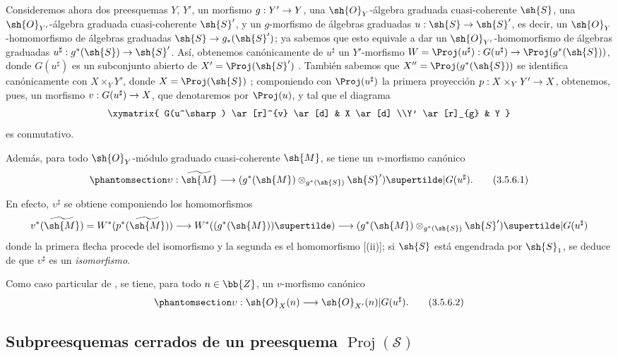\documentclass[oneside,10pt]{amsart}
\makeatletter
\newcommand{\ega@arrow}[2]{\mathchoice{#1}{#2}{#2}{#2}}
\renewcommand{\to}{\ega@arrow{\longrightarrow}{\rightarrow}}
\newcommand{\oldpage}[2][]{\marginnote{\normalfont\footnotesize\textbf{#1}~|~#2}\ignorespaces}
\let\EGAOriginalLabel\label
\renewcommand{\label}[1]{\phantomsection\EGAOriginalLabel{#1}}
\makeatother
\begin{document}
\begin{env}[3.5.6]
\label{II.3.5.6}
Consideremos ahora dos preesquemas $Y$, $Y'$, un morfismo $g:Y'\to Y$, una $\sh{O}_Y$-álgebra graduada cuasi-coherente $\sh{S}$, una $\sh{O}_{Y'}$-álgebra graduada cuasi-coherente $\sh{S}'$, y un $g$-morfismo de álgebras graduadas $u:\sh{S}\to\sh{S}'$, es decir, un $\sh{O}_Y$-homomorfismo de álgebras graduadas $\sh{S}\to g_*(\sh{S}')$; ya sabemos que esto equivale a dar un $\sh{O}_{Y'}$-homomorfismo de álgebras graduadas $u^\sharp:g^*(\sh{S})\to\sh{S}'$.
Así, obtenemos canónicamente de $u^\sharp$ un $Y'$-morfismo $W=\Proj(u^\sharp):G(u^\sharp)\to\Proj(g^*(\sh{S}))$, donde $G(u^\sharp)$ es un subconjunto abierto de $X'=\Proj(\sh{S}')$ .
También sabemos que $X''=\Proj(g^*(\sh{S}))$ se identifica canónicamente con $X\times_Y Y'$, donde $X=\Proj(\sh{S})$ ;
\oldpage[II]{64}
componiendo con $\Proj(u^\sharp)$ la primera proyección $p:X\times_Y Y'\to X$, obtenemos, pues, un morfismo $v:G(u^\sharp)\to X$, que denotaremos por $\Proj(u)$, y tal que el diagrama
\[
  \xymatrix{
    G(u^\sharp) \ar[r]^{v} \ar[d]
    & X \ar[d]
  \\Y' \ar[r]_{g}
    & Y
  }
\]
es conmutativo.

Además, para todo $\sh{O}_Y$-módulo graduado cuasi-coherente $\sh{M}$, se tiene un $v$-morfismo canónico
\[
\label{II.3.5.6.1}
  \upsilon:\widetilde{\sh{M}}\to(g^*(\sh{M})\otimes_{g^*(\sh{S})}\sh{S}')\supertilde|G(u^\sharp).
\tag{3.5.6.1}
\]

En efecto, $\upsilon^\sharp$ se obtiene componiendo los homomorfismos
\[
  v^*(\widetilde{\sh{M}})
  =W^*(p^*(\widetilde{\sh{M}}))
  \to W^*((g^*(\sh{M}))\supertilde)
  \to (g^*(\sh{M})\otimes_{g^*(\sh{S})}\sh{S}')\supertilde|G(u^\sharp)
\]
donde la primera flecha procede del isomorfismo  y la segunda es el homomorfismo [(ii)]; si $\sh{S}$ está engendrada por $\sh{S}_1$, se deduce de  que $\upsilon^\sharp$ es un \emph{isomorfismo}.

Como caso particular de , se tiene, para todo $n\in\bb{Z}$, un $v$-morfismo canónico
\[
\label{II.3.5.6.2}
  \upsilon:\sh{O}_X(n)\to\sh{O}_{X'}(n)|G(u^\sharp).
\tag{3.5.6.2}
\]
\end{env}

\subsection{Subpreesquemas cerrados de un preesquema $\operatorname{Proj}(\mathcal{S})$}
\label{subsection:II.3.6}
\end{document}
